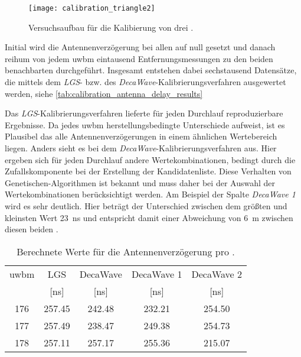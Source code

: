 \begin{figure}[h]
	\centering
	\texttt{[image: calibration\_triangle2]}
	\caption{Versuchsaufbau für die Kalibierung von drei .}
	\label{fig:calibration_triangle2}
\end{figure}

Initial wird die Antennenverzögerung bei allen  auf null gesetzt und danach reihum von jedem \Gls{uwbm} eintausend Entfernungsmessungen zu den beiden benachbarten  durchgeführt. Insgesamt entstehen dabei sechstausend Datensätze, die mittels dem \textit{LGS}- bzw. des \textit{DecaWave}-Kalibrierungsverfahren ausgewertet werden, siehe \autoref{tab:calibration_antenna_delay_results}

Das \textit{LGS}-Kalibrierungsverfahren lieferte für jeden Durchlauf reproduzierbare Ergebnisse. Da jedes \Gls{uwbm} herstellungsbedingte Unterschiede aufweist, ist es Plausibel das alle Antennenverzögerungen in einem ähnlichen Wertebereich liegen. Anders sieht es bei dem \textit{DecaWave}-Kalibrierungsverfahren aus. Hier ergeben sich für jeden Durchlauf andere Wertekombinationen, bedingt durch die Zufallskomponente bei der Erstellung der Kandidatenliste. Diese Verhalten von Genetischen-Algorithmen ist bekannt und muss daher bei der Auswahl der Wertekombinationen berücksichtigt werden. Am Beispiel der Spalte \textit{DecaWave 1} wird es sehr deutlich. Hier beträgt der Unterschied zwischen dem größten und kleinsten Wert \approx\SI{23}{\ns} und entspricht damit einer Abweichung von \approx\SI{6}{\meter} zwischen diesen beiden .

\begin{table}[h]
	\centering
	\begin{tabular}{||c||c||ccc||}
\hline
\Gls{uwbm} & LGS & DecaWave & DecaWave 1 & DecaWave 2 \\
& [\si{\nano\second}] & [\si{\nano\second}] & [\si{\nano\second}] & [\si{\nano\second}] \\
\hline
\hline
176 & \num{257.45} & \num{242.48} & \num{232.21} & \num{254.50} \\
177 & \num{257.49} & \num{238.47} & \num{249.38} & \num{254.73} \\
178 & \num{257.11} & \num{257.17} & \num{255.36} & \num{215.07} \\
\hline
	\end{tabular}
	\caption{Berechnete Werte für die Antennenverzögerung pro .}
	\label{tab:calibration_antenna_delay_results}
\end{table}

